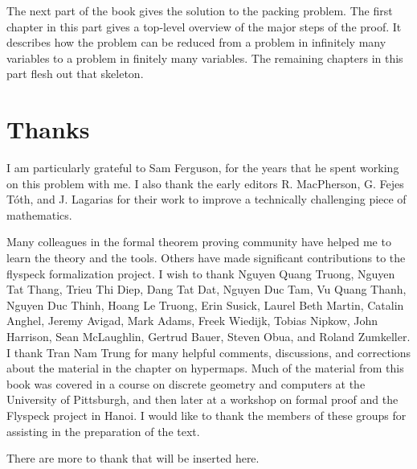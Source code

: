 The next part of the book gives the solution to the packing problem.
The first chapter in this part gives a top-level overview of the major
steps of the proof.  It describes how the problem can be reduced from
a problem in infinitely many variables to a problem in finitely many
variables.  The remaining chapters in this part flesh out that
skeleton.






\section*{Thanks}

I am particularly grateful to Sam Ferguson, for the years that
he spent working on this problem with me.  I also thank the early editors
R. MacPherson, G. Fejes T\'oth, and J. Lagarias for their work
to improve a technically challenging piece of mathematics.  

Many colleagues in the formal theorem proving community have helped me
to learn the theory and the tools.  Others have made significant
contributions to the flyspeck formalization project.  I wish to thank
Nguyen Quang Truong, %
Nguyen Tat Thang, %
Trieu Thi Diep, Dang Tat Dat, Nguyen Duc Tam, Vu Quang Thanh, Nguyen
Duc Thinh, Hoang Le Truong, Erin Susick, Laurel Beth Martin, Catalin
Anghel, Jeremy Avigad, Mark Adams, Freek Wiedijk, Tobias Nipkow, John
Harrison, Sean McLaughlin, Gertrud Bauer, Steven Obua, and Roland
Zumkeller.  I thank Tran Nam Trung for many helpful comments,
discussions, and corrections about the material in the chapter on
hypermaps.  Much of the material from this book was covered in a
course on discrete geometry and computers at the University of
Pittsburgh, and then later at a workshop on formal proof and the
Flyspeck project in Hanoi.  I would like to thank the members of these
groups for assisting in the preparation of the text.



\begin{note}%
There are more to thank that will be inserted here.
\end{note}

